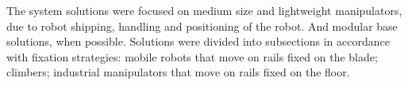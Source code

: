 The system solutions were focused on medium size and lightweight manipulators,
due to robot shipping, handling and positioning of the robot. And modular base
solutions, when possible. Solutions were divided into subsections in accordance
with fixation strategies: mobile robots that move on rails fixed on the blade;
climbers; industrial manipulators that move on rails fixed on the floor.






 
%